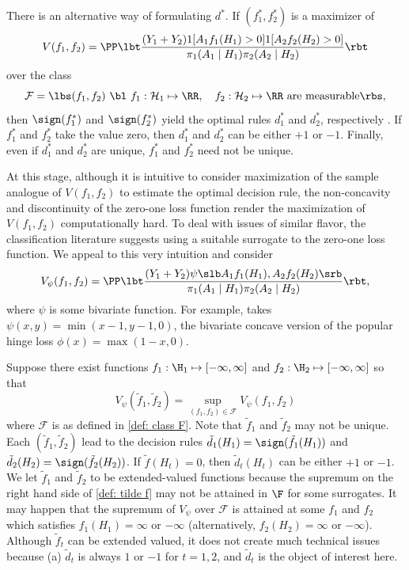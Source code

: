\documentclass[preprint] {imsart}
\begin{document}
There is an alternative way of formulating $d^*$. 
If $(f_1^*,f_2^*)$
is a maximizer of
\begin{equation}\label{def: value function}
   V(f_1,f_2)=\PP\lbt \dfrac{( Y_1+Y_2 ) 1[A_1f_1(H_1)>0]1[A_2f_2(H_2)>0]}{ \pi_1(A_1\mid H_1)\pi_2(A_2\mid H_2)}  \rbt 
\end{equation}
over the class
\begin{equation}\label{def: class F}
\mathcal F=\lbs(f_1,f_2) \ \bl \ f_1:\mathcal{H}_1\mapsto\RR,\quad f_2:\mathcal{H}_2\mapsto\RR \text{ are measurable}\rbs,
\end{equation}
then $\sign(f_1^*)$ and $\sign(f_2^*)$ yield the optimal rules $d_1^*$ and $d_2^*$, respectively \citep{zhao2015}. If $f_1^*$ and $f_2^*$ take the value zero, then $d_1^*$ and $d_2^*$ can be either $+1$ or $-1$. Finally, even if $d_1^*$ and $d_2^*$ are unique,  $f_1^*$ and $f_2^*$ need not be unique. 
 
 
At this stage, although it is intuitive to consider maximization of the sample analogue of $V(f_1,f_2)$ to estimate the optimal decision rule,  the non-concavity and discontinuity of the  zero-one loss function render the maximization of $V(f_1,f_2)$  computationally hard.  To deal with issues of similar flavor, the  classification literature \citep[cf.][]{bartlett2006} suggests using a  suitable surrogate to the zero-one loss function. We appeal to this very intuition and consider 
\begin{equation}\label{def: objective: ours}
V_{\psi}(f_1,f_2)=\PP \lbt\dfrac{(Y_1+Y_2)\psi\slb A_1 f_1(H_1), A_2f_2(H_2)\srb}{\pi_1(A_1\mid H_1)\pi_2(A_2\mid H_2)} \rbt,
\end{equation}
where $\psi$ is some bivariate function. For example, \cite{zhao2015} takes $\psi(x,y)=\min(x-1,y-1,0)$, the bivariate concave version of the popular hinge loss $\phi(x)=\max(1-x,0)$.

 Suppose there exist functions $f_1:\H_1\mapsto[-\infty,\infty]$ and $f_2:\H_2\mapsto[-\infty,\infty]$ so that 
 \begin{equation}\label{def: tilde f}
V_{\psi}(\tilde f_1,\tilde f_2)=\sup_{(f_1,f_2)\in\mathcal F}V_{\psi}(f_1,f_2)
\end{equation}
 where $\mathcal F$ is as defined in \eqref{def: class F}. Note that  $\tilde f_1$ and $\tilde f_2$  may not be  unique. 
Each $(\tilde f_1,\tilde f_2)$ lead to the decision rules $\tilde d_1(H_1)=\sign(\tilde f_1(H_1))$ and
$\tilde d_2(H_2)=\sign(\tilde f_2(H_2))$.  If $\tilde f(H_t)=0$, then $\tilde d_t(H_t)$ can be either $+1$ or $-1$. 
    We let $\tilde f_1$ and $\tilde f_2$  to be extended-valued functions because the supremum on the right hand side of \eqref{def: tilde f} may not be attained in $\F$ for some surrogates. It may happen that the supremum of $V_\psi$ over $\mathcal F$ is attained at some $ f_1$ and $ f_2$ which satisfies $f_1(H_1)=\infty$ or $-\infty$  (alternatively,   $ f_2(H_2)=\infty$ or $-\infty$).  Although $\tilde f_t$ can be extended valued, it does not create much technical issues because (a) $\tilde d_t$ is always  $1$ or $-1$ for $t=1,2$, and $\tilde d_t$ is the  object of interest here.
\end{document}

